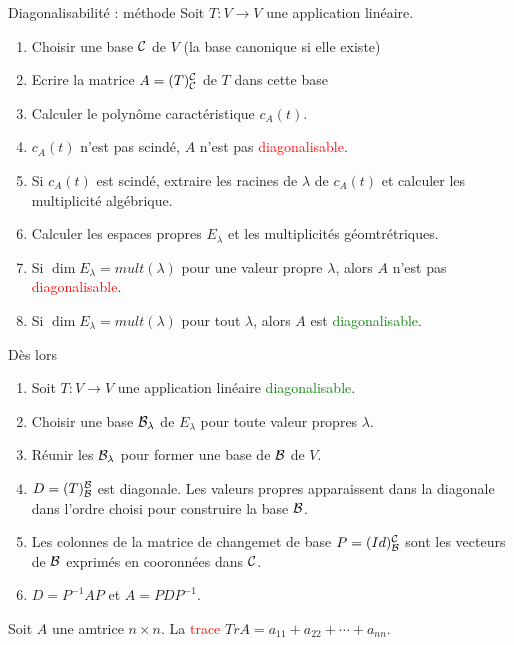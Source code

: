 \begin{parag}{Diagonalisabilité : méthode}
    Soit $T : V \to V$ une application linéaire.
    \begin{enumerate}
        \item Choisir une base $\mathcal{C}$ de $V$ (la base canonique si elle existe)
        \item Ecrire la matrice $A = (T)_{\mathcal{C}}^{\mathcal{C}}$ de $T$ dans cette base
        \item Calculer le polynôme caractéristique $c_A(t)$.
        \item $c_A(t)$ n'est pas scindé, $A$ n'est pas \textcolor{red}{diagonalisable}.
        \item Si $c_A(t)$ est scindé, extraire les racines de $\lambda$ de $c_A(t)$ et calculer les multiplicité algébrique.
        \item Calculer les espaces propres $E_\lambda$ et les multiplicités géomtrétriques.
        \item Si $\dim E_\lambda = mult(\lambda)$ pour une valeur propre $\lambda$, alors $A$ n'est pas \textcolor{red}{diagonalisable}.
        \item Si $\dim E_\lambda = mult(\lambda)$ pour tout $\lambda$, alors $A$ est \textcolor{green}{diagonalisable}.
    \end{enumerate}
    Dès lors
    \begin{enumerate}
        \item Soit $T : V \to V$ une application linéaire \textcolor{green}{diagonalisable}.
        \item Choisir une base $\mathcal{B}_\lambda$ de $E_\lambda$ pour toute valeur propres $\lambda$.
        \item Réunir les $\mathcal{B}_\lambda$ pour former une base de $\mathcal{B}$ de $V$.
        \item $D = (T)_{\mathcal{B}}^{\mathcal{B}}$ est diagonale. Les valeurs propres apparaissent dans la diagonale dans l'ordre choisi pour construire la base $\mathcal{B}$.
        \item Les colonnes de la matrice de changemet de base $P = (Id)_{\mathcal{B}}^{\mathcal{C}}$ sont les vecteurs de $\mathcal{B}$ exprimés en cooronnées dans $\mathcal{C}$.
        \item $D = P^{-1}AP$ et $A = PDP^{-1}$.
    \end{enumerate}
    \end{parag}
    \begin{defintion}
        Soit $A$ une amtrice $n \times n$. La \textcolor{red}{trace} $Tr A = a_{11} + a_{22} + \cdots + a_{nn}$.
    \end{defintion}
